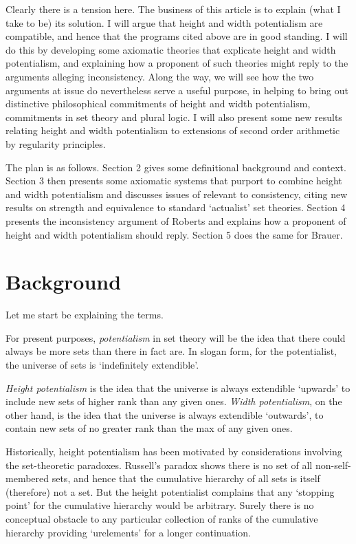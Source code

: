 \documentclass{article}
\begin{document}
	Clearly there is a tension here. 
    The business of this article is to explain 
    (what I take to be) its solution.  
I will argue that height  and width  potentialism 
are compatible, and hence that the programs 
cited above are in good standing. 
I will do this by developing some 
axiomatic theories that explicate height 
and width potentialism, and explaining how a proponent 
of such theories might reply to the arguments alleging inconsistency.
Along the way, we will see how the two arguments 
at issue do nevertheless serve a useful purpose, 
in helping to bring out distinctive philosophical 
commitments of height and width potentialism,
commitments in 
set theory and plural logic. I will also present some new 
results relating height and width potentialism to extensions of 
second order arithmetic by regularity principles.

The plan is as follows. 
Section 2 gives some definitional background and context. 
Section 3 then presents some axiomatic systems that purport to 
combine height  and width  potentialism and discusses
issues of relevant to consistency, citing new results
on strength and equivalence to standard `actualist' 
set theories. Section 4 presents the 
inconsistency argument of Roberts and explains 
how a proponent of height and width potentialism should reply.
Section 5 does the same for Brauer.

\section{Background}
Let me start be explaining the terms. 

For present purposes, \emph{potentialism} in set theory 
will be the idea that there could always be 
more sets than there in fact are. 
In slogan form, for the potentialist,  
the universe of sets is `indefinitely extendible'. 

\emph{Height potentialism} is the idea that the universe
is always extendible `upwards' to include 
new sets of higher rank than any given ones. 
\emph{Width potentialism}, on the other hand, 
is the idea that the universe is always extendible 
`outwards', to contain new sets of no greater rank 
than the max of any given ones.

Historically, height potentialism has been motivated 
by considerations involving the set-theoretic paradoxes. 
Russell's paradox shows there is no set of all 
non-self-membered sets, and hence that the cumulative 
hierarchy of all sets is itself (therefore) not a set. 
But the height potentialist complains that any 
`stopping point' for the cumulative hierarchy 
would be arbitrary. Surely there is no conceptual obstacle 
to any particular collection of ranks of the cumulative 
hierarchy providing `urelements' for a longer continuation.
\end{document}

